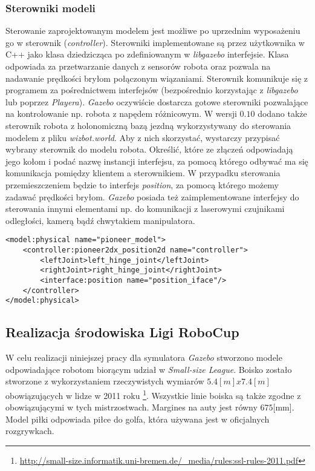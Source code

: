 	\subsubsection{Sterowniki modeli }
	Sterowanie zaprojektowanym modelem jest możliwe po uprzednim wyposażeniu go w sterownik (\textit{controller}). Sterowniki implementowane są przez użytkownika w C++ jako klasa dziedzicząca
	po zdefiniowanym w \textit{libgazebo} interfejsie. Klasa odpowiada za przetwarzanie danych z sensorów robota oraz pozwala
	na nadawanie prędkości bryłom połączonym wiązaniami. Sterownik komunikuje się z programem za pośrednictwem interfejsów (bezpośrednio korzystając z \textit{libgazebo} lub poprzez \textit{Playera}).
	\textit{Gazebo} oczywiście dostarcza gotowe sterowniki pozwalające na kontrolowanie np. robota z napędem różnicowym. W wersji $0.10$ dodano także sterownik robota z holonomiczną bazą jezdną wykorzystywany
	do sterowania modelem z pliku \textit{wizbot.world}. Aby z nich skorzystać, wystarczy przypisać wybrany sterownik do modelu robota. Określić, które ze złączeń odpowiadają jego kołom i podać nazwę instancji interfejsu,
	za pomocą którego odbywać ma się komunikacja pomiędzy klientem a sterownikiem. W przypadku sterowania przemieszczeniem będzie to interfejs \textit{position}, za pomocą którego możemy zadawać prędkości bryłom.
	\textit{Gazebo} posiada też zaimplementowane interfejsy do sterowania innymi elementami np. do komunikacji z laserowymi czujnikami odległości, kamerą bądź chwytakiem manipulatora. 
	\begin{lstlisting}
<model:physical name="pioneer_model">
    <controller:pioneer2dx_position2d name="controller">
        <leftJoint>left_hinge_joint</leftJoint>
        <rightJoint>right_hinge_joint</rightJoint>
        <interface:position name="position_iface"/>
    </controller>
</model:physical>
	\end{lstlisting}	

	
	\subsection{Realizacja środowiska Ligi RoboCup \label{subsect:realizacjaROBOCUP} }
	
	W celu realizacji niniejszej pracy dla symulatora \textit{Gazebo} stworzono modele odpowiadające robotom biorącym udział w \emph{Small-size League}. 
	Boisko zostało stworzone z wykorzystaniem rzeczywistych wymiarów $5.4[m] x 7.4[m]$ obowiązujących w lidze w 2011 roku 
	\protect\footnote{\url{http://small-size.informatik.uni-bremen.de/_media/rules:ssl-rules-2011.pdf}}. Wszystkie linie boiska są także zgodne z obowiązującymi w tych mistrzostwach.
	Margines na auty jest równy $675$[mm].
	Model piłki odpowiada piłce do golfa, która używana jest w oficjalnych rozgrywkach.

